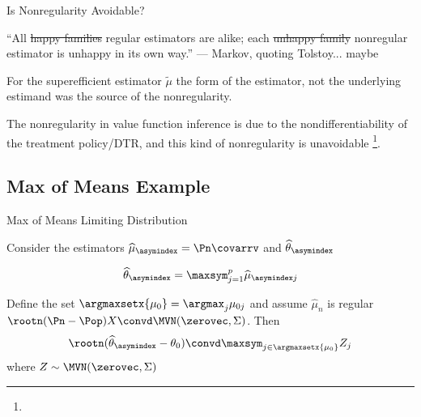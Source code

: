 \documentclass[aspectratio=169, professionalfonts]{beamer}
\begin{document}
\begin{frame}{Is Nonregularity Avoidable?}

	``All \sout{happy families} regular estimators are alike; each \sout{unhappy
		family} nonregular estimator is unhappy in its own way.'' --- Markov,
	quoting Tolstoy\pause... maybe

	\vfill \pause
	For the superefficient estimator $\tilde{\mu}$ the form of the estimator, not
	the underlying estimand was the source of the nonregularity.

	\vfill \pause

	The nonregularity in value function inference is due to the nondifferentiability of the treatment
	policy/DTR, and this kind of nonregularity is unavoidable
	\footnote<4->{}.
	\vfill
\end{frame}

\subsection{Max of Means Example}
\begin{frame}{Max of Means Limiting Distribution}

	Consider the estimators $\widehat{\mu}_{\asymindex} = \Pn \covarrv$  and $\widehat{\theta}_{\asymindex}$

	$$\widehat{\theta}_{\asymindex} = \maxsym_{j = 1}^p \widehat{\mu}_{\asymindex j}$$

	\begin{lemma}
		Define the set $\argmaxsetx{\mu_{0}} = \argmax_j \mu_{0j}$ and assume
		$\widehat{\mu}_n$ is regular $\rootn (\Pn - \Pop)X \convd \MVN(\zerovec, \Sigma)$. Then
		\begin{displaymath}
			\rootn (\widehat{\theta}_{\asymindex} - \theta_0) \convd \maxsym_{j \in \argmaxsetx{\mu_0}} Z_j
		\end{displaymath}
		where $Z \sim \MVN(\zerovec, \Sigma)$
	\end{lemma}

\end{frame}
\end{document}

